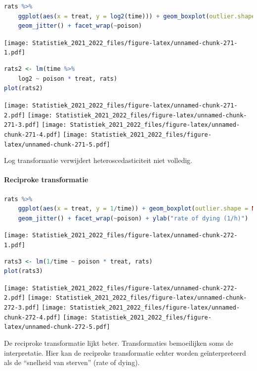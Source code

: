 \documentclass[
  12pt,dutch,coursenotes]{book}
\theoremstyle{definition}
\theoremstyle{definition}
\theoremstyle{definition}
\theoremstyle{definition}
\theoremstyle{remark}
\begin{document}
\begin{lstlisting}[language=R]
rats %>%
    ggplot(aes(x = treat, y = log2(time))) + geom_boxplot(outlier.shape = NA) +
    geom_jitter() + facet_wrap(~poison)
\end{lstlisting}

\texttt{[image: Statistiek\_2021\_2022\_files/figure-latex/unnamed-chunk-271-1.pdf]}

\begin{lstlisting}[language=R]
rats2 <- lm(time %>%
    log2 ~ poison * treat, rats)
plot(rats2)
\end{lstlisting}

\texttt{[image: Statistiek\_2021\_2022\_files/figure-latex/unnamed-chunk-271-2.pdf]} \texttt{[image: Statistiek\_2021\_2022\_files/figure-latex/unnamed-chunk-271-3.pdf]} \texttt{[image: Statistiek\_2021\_2022\_files/figure-latex/unnamed-chunk-271-4.pdf]} \texttt{[image: Statistiek\_2021\_2022\_files/figure-latex/unnamed-chunk-271-5.pdf]}

Log transformatie verwijdert heteroscedasticiteit niet volledig.

\hypertarget{reciproke-transformatie}{%
\paragraph{Reciproke transformatie}\label{reciproke-transformatie}}

\begin{lstlisting}[language=R]
rats %>%
    ggplot(aes(x = treat, y = 1/time)) + geom_boxplot(outlier.shape = NA) +
    geom_jitter() + facet_wrap(~poison) + ylab("rate of dying (1/h)")
\end{lstlisting}

\texttt{[image: Statistiek\_2021\_2022\_files/figure-latex/unnamed-chunk-272-1.pdf]}

\begin{lstlisting}[language=R]
rats3 <- lm(1/time ~ poison * treat, rats)
plot(rats3)
\end{lstlisting}

\texttt{[image: Statistiek\_2021\_2022\_files/figure-latex/unnamed-chunk-272-2.pdf]} \texttt{[image: Statistiek\_2021\_2022\_files/figure-latex/unnamed-chunk-272-3.pdf]} \texttt{[image: Statistiek\_2021\_2022\_files/figure-latex/unnamed-chunk-272-4.pdf]} \texttt{[image: Statistiek\_2021\_2022\_files/figure-latex/unnamed-chunk-272-5.pdf]}

De reciproke transformatie lijkt beter.
Transformaties bemoeilijken soms de interpretatie.
Hier kan de reciproke transformatie echter worden geïnterpreteerd als de ``snelheid van sterven'' (rate of dying).
\end{document}
